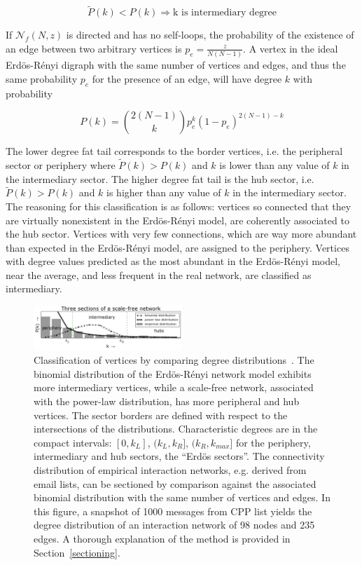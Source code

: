 \begin{equation}\label{criterio}
\widetilde{P}(k)<P(k) \Rightarrow \text{k is intermediary degree}
\end{equation}

If $\mathcal{N}_f(N,z)$ is directed and has no self-loops, the probability of the existence
of an edge between two arbitrary vertices is $p_e=\frac{z}{N(N-1)}$.
A vertex in the ideal Erd\"os-R\'enyi digraph with the same number of vertices and edges, and thus the same probability $p_e$ for the presence of an edge, will have degree $k$ with probability

\begin{equation}
P(k)=\binom{2(N-1)}{k}p_e^k(1-p_e)^{2(N-1)-k}
\end{equation}

The lower degree fat tail corresponds to the border vertices, i.e. the peripheral sector or periphery where $\widetilde{P}(k)>P(k)$ and $k$ is lower than any value of $k$ in the intermediary sector.
The higher degree fat tail is the hub sector, i.e. $\widetilde{P}(k)>P(k)$ and $k$ is higher than any value of $k$ in the intermediary sector. The reasoning for this classification is as follows: vertices so connected that they are virtually nonexistent in the Erd\"os-R\'enyi model, are coherently associated to the hub sector.
Vertices with very few connections, which are way more abundant than expected in the Erd\"os-R\'enyi model,
are assigned to the periphery.
Vertices with degree values predicted as the most abundant in the Erd\"os-R\'enyi model,
near the average, and less frequent in the real network, are classified as intermediary.

\clearpage
\begin{figure}[!h]
\centering
\includegraphics[width=0.5\textwidth]{figs/fser__}
\caption{Classification of vertices by comparing degree
distributions~\cite{3setores}.
The binomial distribution of the Erd\"os-R\'enyi network model exhibits more intermediary vertices, while a scale-free network, associated with the power-law distribution, has more peripheral and hub vertices. The sector borders are defined with respect to the intersections of the distributions. Characteristic degrees are in the compact intervals: $[0,k_L]$, $(k_L,k_R]$, $(k_R,k_{max}]$ for the periphery, intermediary and hub sectors, the ``Erd\"os sectors''.
The connectivity distribution of empirical interaction networks, e.g. derived from email lists, can be sectioned by comparison against the associated binomial distribution with the same number of vertices and edges. In this figure, a snapshot of 1000 messages from CPP list yields the degree distribution of an interaction network of 98 nodes and 235 edges. A thorough explanation of the method is provided in Section~\ref{sectioning}.}
\label{fig:setores}
\end{figure}

